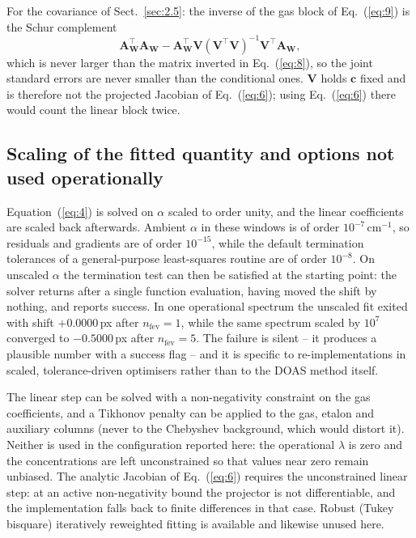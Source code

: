 For the covariance of Sect.~\ref{sec:2.5}: the inverse of the gas block of Eq.~(\ref{eq:9}) is the Schur complement
\begin{equation*}
\mathbf{A}_{\mathbf{W}}^{\top}\mathbf{A}_{\mathbf{W}} - \mathbf{A}_{\mathbf{W}}^{\top}\mathbf{V}(\mathbf{V}^{\top}\mathbf{V})^{-1}\mathbf{V}^{\top}\mathbf{A}_{\mathbf{W}},
\end{equation*}
which is never larger than the matrix inverted in Eq.~(\ref{eq:8}), so the joint standard errors are never
smaller than the conditional ones. $\mathbf{V}$ holds $\mathbf{c}$ fixed and is therefore not the projected
Jacobian of Eq.~(\ref{eq:6}); using Eq.~(\ref{eq:6}) there would count the linear block twice.

\subsection{Scaling of the fitted quantity and options not used operationally}
\label{app:B6}

Equation~(\ref{eq:4}) is solved on $\alpha$ scaled to order unity, and the linear coefficients
are scaled back afterwards. Ambient $\alpha$ in these windows is of order $10^{-7}\,\mathrm{cm^{-1}}$, so
residuals and gradients are of order $10^{-15}$, while the default termination tolerances of a general-purpose
least-squares routine are of order $10^{-8}$. On unscaled $\alpha$ the termination test can then be satisfied at
the starting point: the solver returns after a single function evaluation, having moved the shift by nothing,
and reports success. In one operational spectrum the unscaled fit exited with shift $+0.0000$\,px after
$n_{\mathrm{fev}}=1$, while the same spectrum scaled by $10^{7}$ converged to $-0.5000$\,px after
$n_{\mathrm{fev}}=5$. The failure is silent -- it produces a plausible number with a success flag -- and it is
specific to re-implementations in scaled, tolerance-driven optimisers rather than to the DOAS method itself.

The linear step can be solved with a non-negativity constraint on the gas coefficients, and a Tikhonov penalty
can be applied to the gas, etalon and auxiliary columns (never to the Chebyshev background, which would distort
it). Neither is used in the configuration reported here: the operational $\lambda$ is zero and the concentrations
are left unconstrained so that values near zero remain unbiased. The analytic Jacobian of Eq.~(\ref{eq:6})
requires the unconstrained linear step: at an active non-negativity bound the projector is not differentiable,
and the implementation falls back to finite differences in that case. Robust (Tukey bisquare) iteratively
reweighted fitting is available and likewise unused here.
